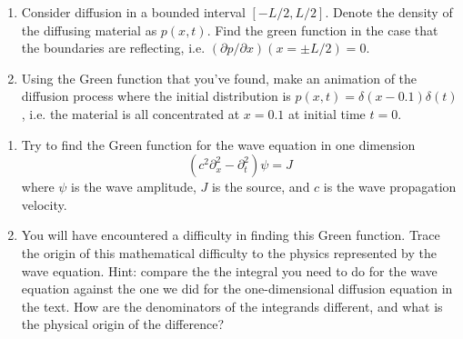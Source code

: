 
\begin{enumerate}[label={(a)}]
  \item Consider diffusion in a bounded interval $[-L/2, L/2]$. Denote the density of the diffusing material as $p(x, t)$. Find the green function in the case that the boundaries are reflecting, i.e. $(\partial p / \partial x)(x=\pm L/2) = 0$.
  \item Using the Green function that you've found, make an animation of the diffusion process where the initial distribution is $p(x, t) = \delta(x-0.1) \delta(t)$, i.e. the material is all concentrated at $x=0.1$ at initial time $t=0$.
\end{enumerate}

\begin{enumerate}[label={(a)}]
  \item Try to find the Green function for the wave equation in one dimension
    \begin{equation}
      \left( c^2 \partial_x^2 - \partial_t^2 \right) \psi = J
    \end{equation}
    where $\psi$ is the wave amplitude, $J$ is the source, and $c$ is the wave propagation velocity.
  \item You will have encountered a difficulty in finding this Green function. Trace the origin of this mathematical difficulty to the physics represented by the wave equation. Hint: compare the the integral you need to do for the wave equation against the one we did for the one-dimensional diffusion equation in the text. How are the denominators of the integrands different, and what is the physical origin of the difference?
\end{enumerate}
